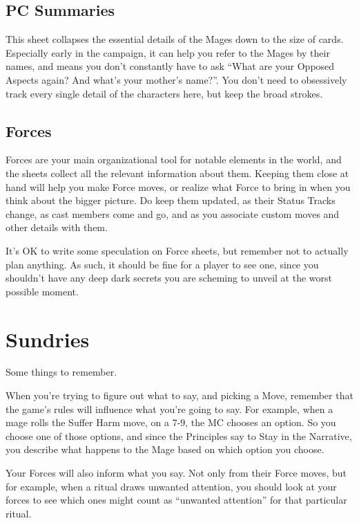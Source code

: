 \documentclass[
  oneside,
  statementpaper,
  9pt]{memoir}
\begin{document}
\hypertarget{pc-summaries}{%
\subsection{PC Summaries}\label{pc-summaries}}

This sheet collapses the essential details of the Mages down to the size
of cards. Especially early in the campaign, it can help you refer to the
Mages by their names, and means you don't constantly have to ask ``What
are your Opposed Aspects again? And what's your mother's name?''. You
don't need to obsessively track every single detail of the characters
here, but keep the broad strokes.

\hypertarget{forces}{%
\subsection{Forces}\label{forces}}

Forces are your main organizational tool for notable elements in the
world, and the sheets collect all the relevant information about them.
Keeping them close at hand will help you make Force moves, or realize
what Force to bring in when you think about the bigger picture. Do keep
them updated, as their Status Tracks change, as cast members come and
go, and as you associate custom moves and other details with them.

It's OK to write some speculation on Force sheets, but remember not to
actually plan anything. As such, it should be fine for a player to see
one, since you shouldn't have any deep dark secrets you are scheming to
unveil at the worst possible moment.

\hypertarget{sundries}{%
\section{Sundries}\label{sundries}}

Some things to remember.

When you're trying to figure out what to say, and picking a Move,
remember that the game's rules will influence what you're going to say.
For example, when a mage rolls the Suffer Harm move, on a 7-9, the MC
chooses an option. So you choose one of those options, and since the
Principles say to Stay in the Narrative, you describe what happens to
the Mage based on which option you choose.

Your Forces will also inform what you say. Not only from their Force
moves, but for example, when a ritual draws unwanted attention, you
should look at your forces to see which ones might count as ``unwanted
attention'' for that particular ritual.
\end{document}
